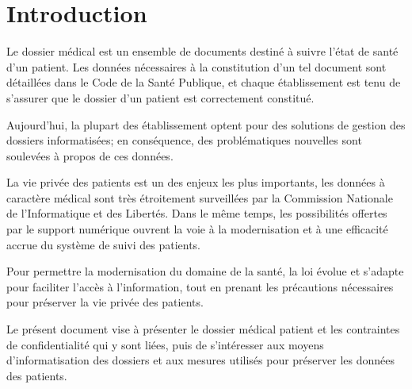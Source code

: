     \section{Introduction}

Le dossier médical est un ensemble de documents destiné à suivre l'état de santé d'un
patient. Les données nécessaires à la constitution d'un tel document sont
détaillées dans le Code de la Santé Publique, et chaque établissement est tenu de s'assurer que le
dossier d'un patient est correctement constitué.

Aujourd'hui, la plupart des établissement optent pour des solutions de gestion des dossiers
informatisées; en conséquence, des problématiques nouvelles sont soulevées à propos de ces données.

La vie privée des patients est un des enjeux les plus importants, les données à caractère médical sont très
étroitement surveillées par la Commission Nationale de l'Informatique et des Libertés. Dans le même temps, 
les possibilités offertes par le support numérique ouvrent la voie à la modernisation et à une
efficacité accrue du système de suivi des patients.

Pour permettre la modernisation du domaine de la santé, la loi évolue et s'adapte pour faciliter
l'accès à l'information, tout en prenant les précautions nécessaires pour préserver la vie privée
des patients.

Le présent document vise à présenter le dossier médical patient et les contraintes
de confidentialité qui y sont liées, puis de s'intéresser aux moyens
d'informatisation des dossiers et aux mesures utilisés pour préserver les données des patients.

